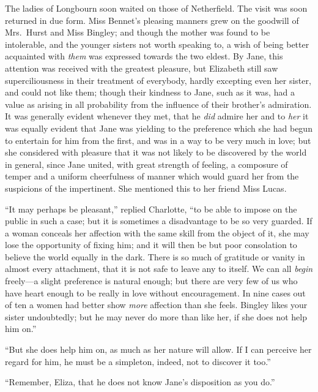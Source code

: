 \documentclass[12pt,english]{book}
\begin{document}


The ladies of Longbourn soon waited on those of Netherfield. The visit
was soon returned in due form. Miss Bennet's pleasing manners grew
on the goodwill of Mrs.\ Hurst and Miss Bingley; and though the mother
was found to be intolerable, and the younger sisters not worth speaking
to, a wish of being better acquainted with \textit{them} was expressed
towards the two eldest. By Jane, this attention was received with
the greatest pleasure, but Elizabeth still saw superciliousness in
their treatment of everybody, hardly excepting even her sister, and
could not like them; though their kindness to Jane, such as it was,
had a value as arising in all probability from the influence of their
brother's admiration. It was generally evident whenever they met,
that he \textit{did} admire her and to \textit{her} it was equally
evident that Jane was yielding to the preference which she had begun
to entertain for him from the first, and was in a way to be very much
in love; but she considered with pleasure that it was not likely to
be discovered by the world in general, since Jane united, with great
strength of feeling, a composure of temper and a uniform cheerfulness
of manner which would guard her from the suspicions of the impertinent.
She mentioned this to her friend Miss Lucas.

{}``It may perhaps be pleasant,'' replied Charlotte, {}``to be
able to impose on the public in such a case; but it is sometimes a
disadvantage to be so very guarded. If a woman conceals her affection
with the same skill from the object of it, she may lose the opportunity
of fixing him; and it will then be but poor consolation to believe
the world equally in the dark. There is so much of gratitude or vanity
in almost every attachment, that it is not safe to leave any to itself.
We can all \textit{begin} freely\mbox{---}a slight preference is
natural enough; but there are very few of us who have heart enough
to be really in love without encouragement. In nine cases out of ten
a women had better show \textit{more} affection than she feels. Bingley
likes your sister undoubtedly; but he may never do more than like
her, if she does not help him on.''

{}``But she does help him on, as much as her nature will allow. If
I can perceive her regard for him, he must be a simpleton, indeed,
not to discover it too.''

{}``Remember, Eliza, that he does not know Jane's disposition as
you do.''
\end{document}
